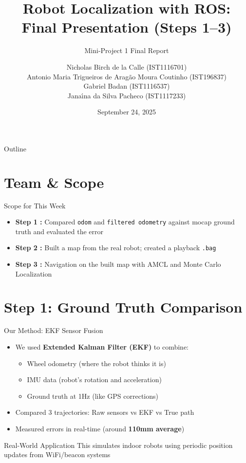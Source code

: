\documentclass[10pt]{beamer}
\title[Robot Localization with ROS]{\texorpdfstring{Robot Localization with ROS: \\Final Presentation (Steps 1–3)}{Robot Localization with ROS: Final Presentation (Steps 1–3)}}
\subtitle{Mini-Project 1 Final Report}
\author{Nicholas Birch de la Calle (IST1116701) \\
Antonio Maria Trigueiros de Arag\~{a}o Moura Coutinho (IST196837) \\
Gabriel Badan (IST1116537) \\
Jana\'{\i}na da Silva Pacheco (IST1117233)}
\institute{Instituto Superior Técnico}
\date{September 24, 2025}
\begin{document}
\begin{frame}
\titlepage
\end{frame}

\begin{frame}{Outline}
\tableofcontents
\end{frame}

\section{Team \& Scope}

\begin{frame}{Scope for This Week}
\begin{itemize}
    \item \textbf{Step 1 :} Compared \texttt{odom} and \texttt{filtered odometry} against mocap ground truth and evaluated the error
    \item \textbf{Step 2 :} Built a map from the real robot; created a playback \texttt{.bag}
    \item \textbf{Step 3 :} Navigation on the built map with AMCL and Monte Carlo Localization
\end{itemize}
\end{frame}

\section{Step 1: Ground Truth Comparison}

\begin{frame}{Our Method: EKF Sensor Fusion}
\begin{itemize}
    \item We used \textbf{Extended Kalman Filter (EKF)} to combine:
    \begin{itemize}
        \item Wheel odometry (where the robot thinks it is)
        \item IMU data (robot's rotation and acceleration)
        \item Ground truth at 1Hz (like GPS corrections)
    \end{itemize}
    \item Compared 3 trajectories: Raw sensors vs EKF vs True path
    \item Measured errors in real-time (around \textbf{110mm average})
\end{itemize}

\vspace{3mm}
\begin{block}{Real-World Application}
This simulates indoor robots using periodic position updates from WiFi/beacon systems
\end{block}
\end{frame}
\end{document}
